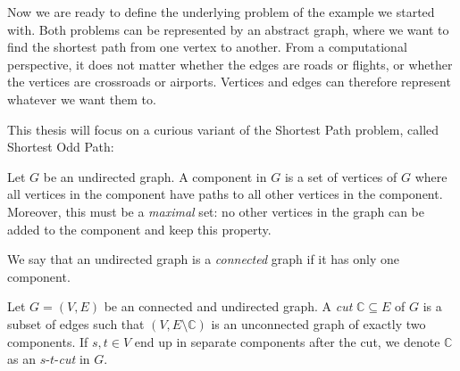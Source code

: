 Now we are ready to define the underlying problem of the example we started with. Both problems can be represented by an abstract graph, where we want to find the shortest path from one vertex to another. From a computational perspective, it does not matter whether the edges are roads or flights, or whether the vertices are crossroads or airports. Vertices and edges can therefore represent whatever we want them to.


This thesis will focus on a curious variant of the Shortest Path problem, called Shortest Odd Path:




\begin{definition}
    Let $G$ be an undirected graph. A component in $G$ is a set of vertices of $G$ where all vertices in the component have paths to all other vertices in the component. Moreover, this must be a \emph{maximal} set: no other vertices in the graph can be added to the component and keep this property.
\end{definition}

\begin{definition}
    We say that an undirected graph is a \emph{connected} graph if it has only one component.
\end{definition}

\begin{definition}[Cut]
    Let $G = (V, E)$ be an connected and undirected graph. A \emph{cut} $\mathbb{C} \subseteq E$ of $G$ is a subset of edges such that $(V, E \setminus \mathbb{C})$ is an unconnected graph of exactly two components. If $s,t \in V$ end up in separate components after the cut, we denote $\mathbb{C}$ as an $s$-$t$-\emph{cut} in $G$.
\end{definition}